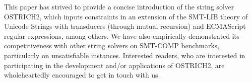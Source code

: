 
This paper has strived to provide a concise introduction of the string solver 
OSTRICH2, which inputs constraints in an extension of the SMT-LIB theory of 
Unicode Strings with transducers (through mutual recursion) and ECMAScript
regular expressions, among others. We have also empirically demonstrated its 
competitiveness with other string solvers on SMT-COMP benchmarks, particularly 
on unsatisfiable instances. Interested readers, who are interested in
participating in the development and/or applications of OSTRICH2, are
wholeheartedly encouraged to get in touch with us.
